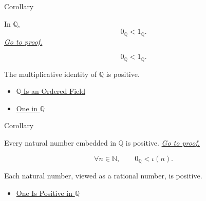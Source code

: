 \begin{corollarybox}{Corollary}
\begin{corollary}
\label{cor:one-positive-on-q}
In $\mathbb{Q}$,
\[
0_{\mathbb{Q}}<1_{\mathbb{Q}}.
\]
\hyperref[prf:one-positive-on-q]{\textit{Go to proof.}}
\end{corollary}
\end{corollarybox}

\begin{remark*}
\[
0_{\mathbb{Q}}<1_{\mathbb{Q}}.
\]
\end{remark*}

\begin{remark*}[Interpretation]
The multiplicative identity of $\mathbb{Q}$ is positive.
\end{remark*}

\begin{dependencies}
\begin{itemize}
  \item \hyperref[thm:q-is-an-ordered-field]{$\mathbb{Q}$ Is an Ordered Field}
  \item \hyperref[def:one-in-q]{One in $\mathbb{Q}$}
\end{itemize}
\end{dependencies}

\begin{corollarybox}{Corollary}
\begin{corollary}
\label{cor:natural-numbers-positive-on-q}
Every natural number embedded in $\mathbb{Q}$ is positive.
\hyperref[prf:natural-numbers-positive-on-q]{\textit{Go to proof.}}
\end{corollary}
\end{corollarybox}

\begin{remark*}
\[
\forall n\in\mathbb{N},\qquad 0_{\mathbb{Q}}<\iota(n).
\]
\end{remark*}

\begin{remark*}[Interpretation]
Each natural number, viewed as a rational number, is positive.
\end{remark*}

\begin{dependencies}
\begin{itemize}
  \item \hyperref[cor:one-positive-on-q]{One Is Positive in $\mathbb{Q}$}
\end{itemize}
\end{dependencies}

